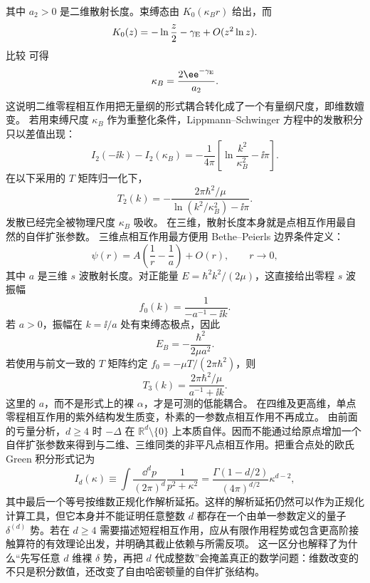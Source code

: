 其中 $a_2>0$ 是二维散射长度。束缚态由 $K_0(\kappa_B r)$ 给出，而
\[
K_0(z)=-\ln\frac z2-\gamma_{\rm E}+O(z^2\ln z).
\]
比较 可得
\begin{equation}
\kappa_B=\frac{2\ee^{-\gamma_{\rm E}}}{a_2}.
\label{eq:phys-hdqm-point-2d-kappa}
\end{equation}
这说明二维零程相互作用把无量纲的形式耦合转化成了一个有量纲尺度，即维数嬗变。
若用束缚尺度 $\kappa_B$ 作为重整化条件，Lippmann--Schwinger 方程中的发散积分只以差值出现：
\[
I_2(-\ii k)-I_2(\kappa_B)
=-\frac{1}{4\pi}
\left[\ln\frac{k^2}{\kappa_B^2}-\ii\pi\right].
\]
在以下采用的 $T$ 矩阵归一化下，
\begin{equation}
T_2(k)=
-\frac{2\pi\hbar^2/\mu}
{\ln(k^2/\kappa_B^2)-\ii\pi}.
\label{eq:phys-hdqm-delta-t-2d}
\end{equation}
发散已经完全被物理尺度 $\kappa_B$ 吸收。
在三维，散射长度本身就是点相互作用最自然的自伴扩张参数。
三维点相互作用最方便用 Bethe--Peierls 边界条件定义：
\begin{equation}
\psi(r)=A\left(\frac1r-\frac1a\right)+O(r),
\qquad r\to0,
\label{eq:phys-hdqm-bethe-peierls}
\end{equation}
其中 $a$ 是三维 $s$ 波散射长度。对正能量 $E=\hbar^2k^2/(2\mu)$，这直接给出零程 $s$ 波振幅
\begin{equation}
f_0(k)=\frac{1}{-a^{-1}-\ii k}.
\label{eq:phys-hdqm-contact-3d-amplitude}
\end{equation}
若 $a>0$，振幅在 $k=\ii/a$ 处有束缚态极点，因此
\begin{equation}
E_B=-\frac{\hbar^2}{2\mu a^2}.
\label{eq:phys-hdqm-contact-3d-bound-energy}
\end{equation}
若使用与前文一致的 $T$ 矩阵约定 $f_0=-\mu T/(2\pi\hbar^2)$，则
\begin{equation}
T_3(k)=\frac{2\pi\hbar^2/\mu}{a^{-1}+\ii k}.
\label{eq:phys-hdqm-contact-3d-t}
\end{equation}
这里的 $a$，而不是形式上的裸 $\alpha$，才是可测的低能耦合。
在四维及更高维，单点零程相互作用的紫外结构发生质变，朴素的一参数点相互作用不再成立。
由前面的亏量分析，$d\ge4$ 时 $-\Delta$ 在 $\mathbb R^d\setminus\{0\}$ 上本质自伴。因而不能通过给原点增加一个自伴扩张参数来得到与二维、三维同类的非平凡点相互作用。把重合点处的欧氏 Green 积分形式记为
\[
I_d(\kappa)
\equiv\int\frac{\dd^dp}{(2\pi)^d}\frac1{p^2+\kappa^2}
=\frac{\Gamma(1-d/2)}{(4\pi)^{d/2}}\kappa^{d-2},
\]
其中最后一个等号按维数正规化作解析延拓。这样的解析延拓仍然可以作为正规化计算工具，但它本身并不能证明任意整数 $d$ 都存在一个由单一参数定义的量子 $\delta^{(d)}$ 势。若在 $d\ge4$ 需要描述短程相互作用，应从有限作用程势或包含更高阶接触算符的有效理论出发，并明确其截止依赖与所需反项。
这一区分也解释了为什么“先写任意 $d$ 维裸 $\delta$ 势，再把 $d$ 代成整数”会掩盖真正的数学问题：维数改变的不只是积分数值，还改变了自由哈密顿量的自伴扩张结构。
